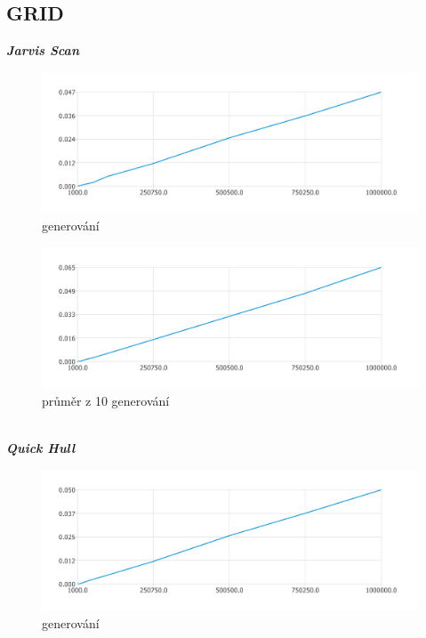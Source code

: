 \documentclass{article}
\begin{document}
\subsection{GRID}
\textit{\textbf {Jarvis Scan}}
\\
\begin{figure}[htbp]
\centering
        \includegraphics[clip, trim=0cm 0cm 0cm 0cm, width=1\textwidth]{pdf10.pdf}
        \caption{generování}
\end{figure}
\begin{figure}[htbp]
\centering
        \includegraphics[clip, trim=0cm 0cm 0cm 0cm, width=1\textwidth]{grj.pdf}
        \caption{průměr z 10 generování}
\end{figure}
\\
\clearpage
\newpage
\textit{\textbf {Quick Hull}}
\\
\begin{figure}[htbp]
\centering
        \includegraphics[clip, trim=0cm 0cm 0cm 0cm, width=1\textwidth]{pdf13.pdf}
        \caption{generování}
\end{figure}
\end{document}
